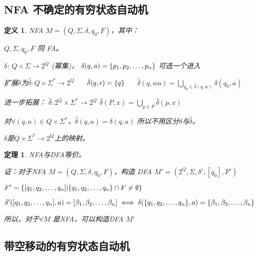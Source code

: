 \documentclass[twocolumn,zihao=5,linespread=1,heading=false,autoindent=0pt]{ctexart}
\DeclarePairedDelimiter{\set}{\{}{\}}
\theoremstyle{exampstyle} \newtheorem{definition}{定义}[section]
\theoremstyle{exampstyle} \newtheorem{example}{例}[section]
\theoremstyle{exampstyle} \newtheorem{theorem}{定理}[section]
\theoremstyle{exampstyle} \newtheorem{lemma}{引理}[section]
\theoremstyle{exampstyle} \newtheorem{myproof}{证明}[section]
\begin{document}
\subsection{NFA 不确定的有穷状态自动机}
\begin{definition}
    NFA $M = (Q, \Sigma, \delta, q_0, F)$，其中：

    $Q, \Sigma, q_0, F$ 同 FA。

    $\delta$: $Q \times \Sigma \to 2^Q$ (幂集)，
    $\delta(q, a) = \set*{p_1, p_2, \dots, p_n}$ 可选一个进入

    扩展$\delta$为$\hat{\delta}: Q \times \Sigma^* \to 2^Q$ ~~
    $
            \hat{\delta}(q,\epsilon)  = \set*{q} 
    $ ~~
    $
            \hat{\delta}(q, wa) = \bigcup_{q_0 \in \hat{\delta}(q,w)}\delta(q_0, a)
    $

    进一步拓展： $\hat{\delta}: 2^Q \times \Sigma^* \to 2^Q$
    $
        \hat{\delta}(P, x) = \bigcup_{p \in P}\hat{\delta}(p, x)
    $

    对$\forall (q, a) \in Q \times \Sigma^*$，$\hat{\delta}(q, a) = \delta(q, a)$
    所以不用区分$\delta$与$\hat{\delta}$。 

    $\delta$是$Q \times \Sigma^* \to 2^Q$上的映射。
\end{definition}


\begin{theorem}
    NFA与DFA等价。

    证：对于NFA $ M= (Q, \Sigma, \delta, q_0, F)$，构造
    DFA $M' = (2^Q, \Sigma, \delta', [q_0], F')$

    $F'= \set*{[q_1, q_2, \dots, q_n] |
     \set*{q_1, q_2, \dots, q_n} \cap F \ne \emptyset}$

    $\delta'([q_1, q_2, \dots, q_n], a) = 
    [\beta_1, \beta_2, \dots, \beta_n] \iff 
    \delta(\set*{q_1, q_2, \dots, q_n}, a) = \set*{\beta_1, \beta_2, \dots, \beta_n}
    $

    所以，对于$\forall M$ 是NFA，可以构造DFA $M'$
\end{theorem}

\subsection{带空移动的有穷状态自动机}
\end{document}
